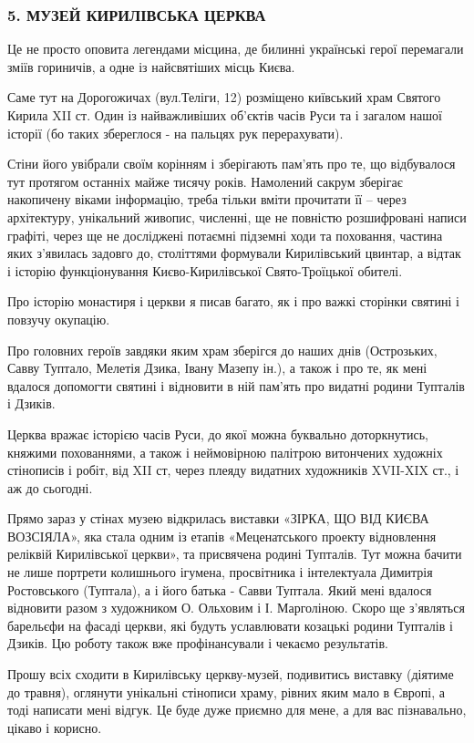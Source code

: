  
 
 
 
 
\subsubsection{5. МУЗЕЙ КИРИЛІВСЬКА ЦЕРКВА}


Це не просто оповита легендами місцина, де билинні українські герої перемагали
зміїв гориничів, а одне із найсвятіших місць Києва.

Саме тут на Дорогожичах (вул.Теліги, 12) розміщено київський храм Святого
Кирила XII ст.  Один із найважливіших об’єктів часів Руси та і загалом нашої
історії (бо таких збереглося - на пальцях рук перерахувати).

Стіни його увібрали своїм корінням і зберігають пам’ять про те, що відбувалося
тут протягом останніх майже тисячу років. Намолений сакрум зберігає накопичену
віками інформацію, треба тільки вміти прочитати її – через архітектуру,
унікальний живопис, численні, ще не повністю розшифровані написи графіті, через
ще не досліджені потаємні підземні ходи та поховання, частина яких з'явилась
задовго до, століттями формували Кирилівський цвинтар, а відтак і історію
функціонування Києво-Кирилівської Свято-Троїцької обителі.

Про історію монастиря і церкви я писав багато, як і про важкі сторінки святині
і повзучу окупацію.

Про головних героїв завдяки яким храм зберігся до наших днів (Острозьких, Савву
Туптало, Мелетія Дзика, Івану Мазепу ін.), а також і про те, як мені вдалося
допомогти святині і відновити в ній пам’ять про видатні родини Тупталів і
Дзиків.

Церква вражає історією часів Руси, до якої можна буквально доторкнутись,
княжими похованнями, а також і неймовірною палітрою витончених художніх
стінописів і робіт, від XII ст, через плеяду видатних художників XVII-XIX ст.,
і аж до сьогодні.

Прямо зараз у стінах музею відкрилась виставки «ЗІРКА, ЩО ВІД КИЄВА ВОЗСІЯЛА»,
яка стала одним із етапів «Меценатського проекту відновлення реліквій
Кирилівської церкви», та присвячена родині Тупталів. Тут можна бачити не лише
портрети колишнього ігумена, просвітника і інтелектуала Димитрія Ростовського
(Туптала), а і його батька - Савви Туптала. Який мені вдалося відновити разом з
художником О. Ольховим і І. Марголіною. Скоро ще з’являться барельєфи на фасаді
церкви, які будуть уславлювати козацькі родини Тупталів і Дзиків. Цю роботу
також вже профінансували і чекаємо результатів.

Прошу всіх сходити в Кирилівську церкву-музей, подивитись виставку (діятиме до
травня), оглянути унікальні стінописи храму, рівних яким мало в Європі, а тоді
написати мені відгук. Це буде дуже приємно для мене, а для вас пізнавально,
цікаво і корисно.
